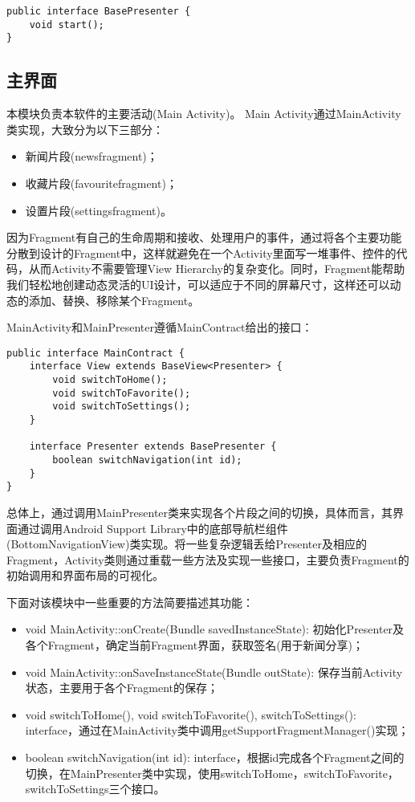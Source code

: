\documentclass[UTF8]{ctexart}
\begin{document}
\begin{verbatim}
public interface BasePresenter {
    void start();
}
\end{verbatim}

\subsection{主界面}

	本模块负责本软件的主要活动(Main Activity)。 Main Activity通过MainActivity类实现，大致分为以下三部分：

	\begin{itemize} 
		\item 新闻片段(newsfragment)； 
		\item 收藏片段(favouritefragment)； 
		\item 设置片段(settingsfragment)。
	\end{itemize}

	因为Fragment有自己的生命周期和接收、处理用户的事件，通过将各个主要功能分散到设计的Fragment中，这样就避免在一个Activity里面写一堆事件、控件的代码，从而Activity不需要管理View Hierarchy的复杂变化。同时，Fragment能帮助我们轻松地创建动态灵活的UI设计，可以适应于不同的屏幕尺寸，这样还可以动态的添加、替换、移除某个Fragment。

	MainActivity和MainPresenter遵循MainContract给出的接口：

\begin{verbatim}
public interface MainContract {
    interface View extends BaseView<Presenter> {
        void switchToHome();
        void switchToFavorite();
        void switchToSettings();
    }

    interface Presenter extends BasePresenter {
        boolean switchNavigation(int id);
    }
}
\end{verbatim}

	总体上，通过调用MainPresenter类来实现各个片段之间的切换，具体而言，其界面通过调用Android Support Library中的底部导航栏组件(BottomNavigationView)类实现。将一些复杂逻辑丢给Presenter及相应的Fragment，Activity类则通过重载一些方法及实现一些接口，主要负责Fragment的初始调用和界面布局的可视化。

	下面对该模块中一些重要的方法简要描述其功能：
	\begin{itemize}
		\item void MainActivity::onCreate(Bundle savedInstanceState):
			初始化Presenter及各个Fragment，确定当前Fragment界面，获取签名(用于新闻分享)；
		\item void MainActivity::onSaveInstanceState(Bundle outState):
			保存当前Activity状态，主要用于各个Fragment的保存；
		\item void switchToHome(), void switchToFavorite(), switchToSettings():
			interface，通过在MainActivity类中调用getSupportFragmentManager()实现；
		\item boolean switchNavigation(int id):
			interface，根据id完成各个Fragment之间的切换，在MainPresenter类中实现，使用switchToHome，switchToFavorite，switchToSettings三个接口。
	\end{itemize}
\end{document}
